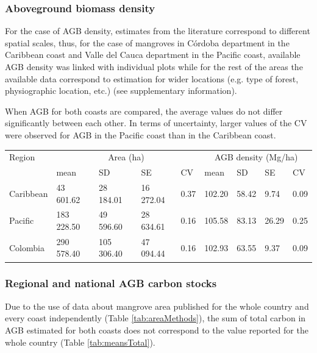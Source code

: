 \documentclass[review, authoryear]{elsarticle}   	%
\begin{document}
\subsubsection{Aboveground biomass density}
For the case of AGB density, estimates from the literature correspond to different spatial scales, thus, for the case of mangroves in C\'ordoba department in the Caribbean coast and Valle del Cauca department in the Pacific coast, available AGB density was linked with individual plots while for the rest of the areas the available data correspond to estimation for wider locations (e.g. type of forest, physiographic location, etc.) (see supplementary information). 

When AGB for both coasts are compared, the average values do not differ significantly between each other. In terms of uncertainty, larger values of the CV were observed for AGB in the Pacific coast than in the Caribbean coast. 

\begin{table}[htbp]
   \centering
   \begin{tabular}{p{1.5cm}p{1.8cm}p{1.8cm}p{1.8cm}p{1.0cm}p{1.0cm}p{1.0cm}p{1.0cm}p{1.0cm}} %
      \toprule
      
       Region & \multicolumn{4}{c}{Area (ha)} & \multicolumn{4}{c}{AGB density (Mg/ha)}\\
      &mean&SD&SE&CV&mean&SD&SE&CV\\
            \midrule
      Caribbean&43 601.62&28 184.01&16 272.04&0.37&102.20&58.42&9.74&0.09\\
      Pacific&183 228.50&49 596.60&28 634.61&0.16&105.58&83.13&26.29&0.25\\
      Colombia&290 578.40&105 306.40 &47 094.44&0.16&102.93&63.55&9.37&0.09\\
            \bottomrule
   \end{tabular}
   \label{tab:means}
\end{table}


\subsubsection{Regional and national AGB carbon stocks}
Due to the use of data about mangrove area published for the whole country and every coast independently (Table \ref{tab:areaMethods}), the sum of total carbon in AGB estimated for both coasts does not correspond to the value reported for the whole country (Table \ref{tab:meansTotal}).
\end{document}
